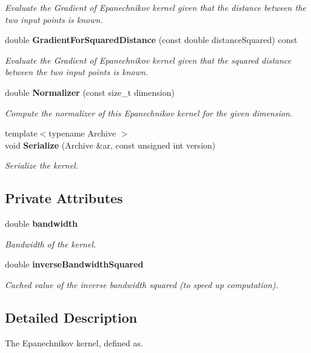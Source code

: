 \begin{DoxyCompactItemize}
\begin{DoxyCompactList}\small\item\em Evaluate the Gradient of Epanechnikov kernel given that the distance between the two input points is known. \end{DoxyCompactList}\item 
double {\bf Gradient\+For\+Squared\+Distance} (const double distance\+Squared) const 
\begin{DoxyCompactList}\small\item\em Evaluate the Gradient of Epanechnikov kernel given that the squared distance between the two input points is known. \end{DoxyCompactList}\item 
double {\bf Normalizer} (const size\+\_\+t dimension)
\begin{DoxyCompactList}\small\item\em Compute the normalizer of this Epanechnikov kernel for the given dimension. \end{DoxyCompactList}\item 
{\footnotesize template$<$typename Archive $>$ }\\void {\bf Serialize} (Archive \&ar, const unsigned int version)
\begin{DoxyCompactList}\small\item\em Serialize the kernel. \end{DoxyCompactList}\end{DoxyCompactItemize}
\subsection*{Private Attributes}
\begin{DoxyCompactItemize}
\item 
double {\bf bandwidth}
\begin{DoxyCompactList}\small\item\em Bandwidth of the kernel. \end{DoxyCompactList}\item 
double {\bf inverse\+Bandwidth\+Squared}
\begin{DoxyCompactList}\small\item\em Cached value of the inverse bandwidth squared (to speed up computation). \end{DoxyCompactList}\end{DoxyCompactItemize}


\subsection{Detailed Description}
The Epanechnikov kernel, defined as. 

